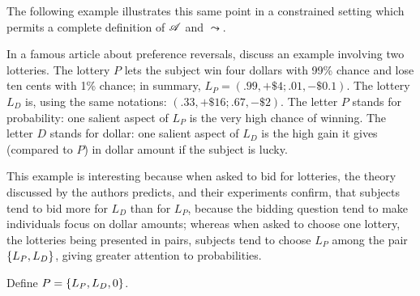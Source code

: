 \documentclass[version=last, pagesize, twoside=off, bibliography=totoc, DIV=calc, fontsize=12pt, a4paper, french, english]{scrartcl}
\begin{document}
The following example illustrates this same point in a constrained setting which permits a complete definition of $\mathscr{A}$ and $\leadsto$.%
\begin{example}
	\label{ex:lichtenstein}
	In a famous article about preference reversals, \citet{lichtenstein_reversals_2006} discuss an example involving two lotteries. The lottery $P$ lets the subject win four dollars with 99\% chance and lose ten cents with 1\% chance; in summary, $L_P = (.99, +\$4; .01, −\$0.1)$. The lottery $L_D$ is, using the same notations: $(.33, +\$16; .67, −\$2)$. The letter $P$ stands for probability: one salient aspect of $L_P$ is the very high chance of winning. The letter $D$ stands for dollar: one salient aspect of $L_D$ is the high gain it gives (compared to $P$) in dollar amount if the subject is lucky.

This example is interesting because when asked to bid for lotteries, the theory discussed by the authors predicts, and their experiments confirm, that subjects tend to bid more for $L_D$ than for $L_P$, because the bidding question tend to make individuals focus on dollar amounts; whereas when asked to choose one lottery, the lotteries being presented in pairs, subjects tend to choose $L_P$ among the pair $\{L_P, L_D\}$, giving greater attention to probabilities.

Define $P = \{L_P, L_D, 0\}$.


\end{example}
\end{document}
